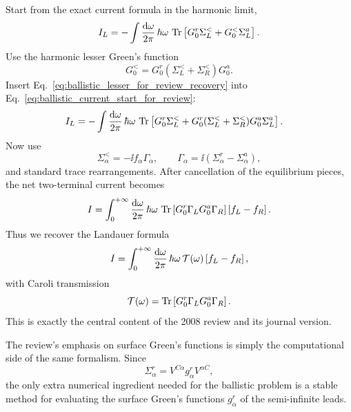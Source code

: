 Start from the exact current formula in the harmonic limit,
\begin{equation}
    I_L = -\int \frac{\mathrm{d}\omega}{2\pi}\,\hbar\omega\,\operatorname{Tr}\left[ G_0^r\Sigma_L^< + G_0^<\Sigma_L^a \right].
    \label{eq:ballistic_current_start_for_review}
\end{equation}
Use the harmonic lesser Green's function
\begin{equation}
    G_0^< = G_0^r(\Sigma_L^< + \Sigma_R^<)G_0^a.
    \label{eq:ballistic_lesser_for_review_recovery}
\end{equation}
Insert Eq.~\eqref{eq:ballistic_lesser_for_review_recovery} into Eq.~\eqref{eq:ballistic_current_start_for_review}:
\begin{align}
    I_L
    &= -\int \frac{\mathrm{d}\omega}{2\pi}\,\hbar\omega\,
       \operatorname{Tr}\left[ G_0^r\Sigma_L^< + G_0^r(\Sigma_L^< + \Sigma_R^<)G_0^a\Sigma_L^a \right].
\end{align}
Now use
\begin{equation}
    \Sigma_\alpha^< = -\ii f_\alpha\Gamma_\alpha,
    \qquad
    \Gamma_\alpha = \ii(\Sigma_\alpha^r - \Sigma_\alpha^a),
\end{equation}
and standard trace rearrangements. After cancellation of the equilibrium pieces, the net two-terminal current becomes
\begin{equation}
    I = \int_0^{+\infty}\frac{\mathrm{d}\omega}{2\pi}\,\hbar\omega\,\operatorname{Tr}\left[ G_0^r\Gamma_L G_0^a\Gamma_R \right]\left[ f_L-f_R \right].
\end{equation}
Thus we recover the Landauer formula
\begin{equation}
    I = \int_0^{+\infty}\frac{\mathrm{d}\omega}{2\pi}\,\hbar\omega\,\mathcal T(\omega)\left[ f_L-f_R \right],
\end{equation}
with Caroli transmission
\begin{equation}
    \mathcal T(\omega) = \operatorname{Tr}\left[ G_0^r\Gamma_L G_0^a\Gamma_R \right].
    \label{eq:caroli_recovered_from_review}
\end{equation}
This is exactly the central content of the 2008 review and its journal version.

The review's emphasis on surface Green's functions is simply the computational side of the same formalism. Since
\begin{equation}
    \Sigma_\alpha^r = V^{C\alpha}g_\alpha^rV^{\alpha C},
\end{equation}
the only extra numerical ingredient needed for the ballistic problem is a stable method for evaluating the surface Green's functions $g_\alpha^r$ of the semi-infinite leads.

